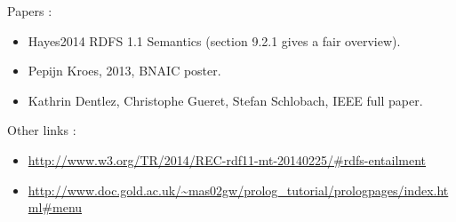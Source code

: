 \documentclass{article}
\newenvironment{itemh}[0]{\begin{itemize}[label=$\heartsuit$, font=\color{mygray} \small]}{\end{itemize}}
\begin{document}
\newpage


	Papers :
		\begin{itemh}
			\item Hayes2014 RDFS 1.1 Semantics (section 9.2.1 gives a fair overview).
			\item Pepijn Kroes, 2013, BNAIC poster.
			\item Kathrin Dentlez, Christophe Gueret, Stefan Schlobach, IEEE full paper.
		\end{itemh}
	Other links :
		\begin{itemh}
			\item\url{http://www.w3.org/TR/2014/REC-rdf11-mt-20140225/#rdfs-entailment}
			\item \url{http://www.doc.gold.ac.uk/~mas02gw/prolog_tutorial/prologpages/index.html#menu}
		\end{itemh}
\end{document}
